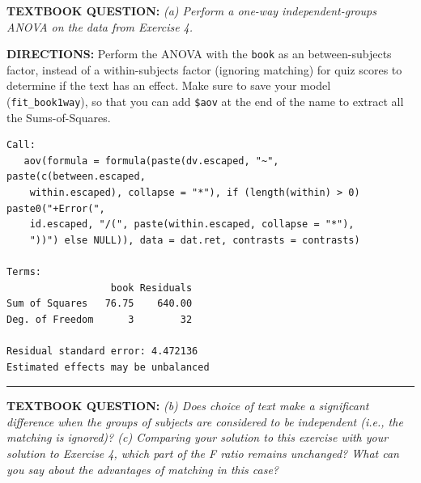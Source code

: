 \documentclass[]{article}
\newenvironment{Shaded}{\begin{snugshade}}{\end{snugshade}}
\newcommand{\KeywordTok}[1]{\textcolor[rgb]{0.13,0.29,0.53}{\textbf{#1}}}
\newcommand{\DataTypeTok}[1]{\textcolor[rgb]{0.13,0.29,0.53}{#1}}
\newcommand{\DecValTok}[1]{\textcolor[rgb]{0.00,0.00,0.81}{#1}}
\newcommand{\StringTok}[1]{\textcolor[rgb]{0.31,0.60,0.02}{#1}}
\newcommand{\CommentTok}[1]{\textcolor[rgb]{0.56,0.35,0.01}{\textit{#1}}}
\newcommand{\OperatorTok}[1]{\textcolor[rgb]{0.81,0.36,0.00}{\textbf{#1}}}
\newcommand{\NormalTok}[1]{#1}
\begin{document}
\textbf{TEXTBOOK QUESTION:} \emph{(a) Perform a one-way
independent-groups ANOVA on the data from Exercise 4.}

\textbf{DIRECTIONS:} Perform the ANOVA with the \texttt{book} as an
between-subjects factor, instead of a within-subjects factor (ignoring
matching) for quiz scores to determine if the text has an effect. Make
sure to save your model (\texttt{fit\_book1way}), so that you can add
\texttt{\$aov} at the end of the name to extract all the
Sums-of-Squares.

\begin{Shaded}
\end{Shaded}

\begin{verbatim}
Call:
   aov(formula = formula(paste(dv.escaped, "~", paste(c(between.escaped, 
    within.escaped), collapse = "*"), if (length(within) > 0) paste0("+Error(", 
    id.escaped, "/(", paste(within.escaped, collapse = "*"), 
    "))") else NULL)), data = dat.ret, contrasts = contrasts)

Terms:
                  book Residuals
Sum of Squares   76.75    640.00
Deg. of Freedom      3        32

Residual standard error: 4.472136
Estimated effects may be unbalanced
\end{verbatim}

\begin{center}\rule{0.5\linewidth}{\linethickness}\end{center}

\textbf{TEXTBOOK QUESTION:} \emph{(b) Does choice of text make a
significant difference when the groups of subjects are considered to be
independent (i.e., the matching is ignored)? (c) Comparing your solution
to this exercise with your solution to Exercise 4, which part of the F
ratio remains unchanged? What can you say about the advantages of
matching in this case?}
\end{document}
